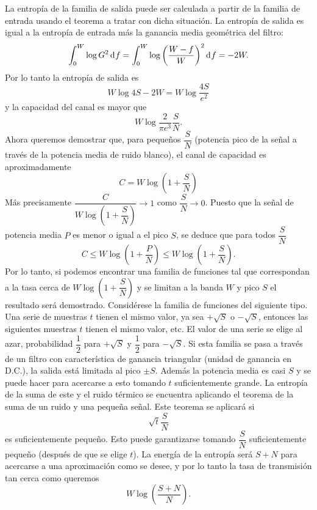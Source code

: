 La entrop\'ia de la familia de salida puede ser calculada a partir
de la familia de entrada usando el teorema a tratar con dicha
situaci\'on. La entrop\'ia de salida es igual a la entrop\'ia de
entrada m\'as la ganancia media geom\'etrica del filtro:
\begin{equation}
  \int_{0}^{W} \log G^2 \diff f = \int_{0}^{W} \log \left(
  \dfrac{W - f}{W} \right)^2 \diff f = -2W.
\end{equation}
Por lo tanto la entrop\'ia de salida es
\begin{equation}
  W \log 4S - 2W = W \log \dfrac{4S}{e^2}
\end{equation}
y la capacidad del canal es mayor que
\begin{equation}
  W \log \dfrac{2}{\pi e^3} \dfrac{S}{N}.
\end{equation}
Ahora queremos demostrar que, para peque\~nos $\dfrac{S}{N}$
(potencia pico de la se\~nal a trav\'es de la potencia media de
ruido blanco), el canal de capacidad es aproximadamente
\begin{equation}
  C = W \log \left(1 + \dfrac{S}{N} \right)
\end{equation}
M\'as precisamente
$\dfrac{C}{W \log \left(1 + \dfrac{S}{N} \right)} \to 1$ como
$\dfrac{S}{N} \to 0$. Puesto que la se\~nal de potencia media $P$ es
menor o igual a el pico $S$, se deduce que para todos $\dfrac{S}{N}$
\begin{equation}
  C \le W \log \left(1 + \dfrac{P}{N} \right)
  \le W \log \left(1 + \dfrac{S}{N} \right).
\end{equation}
Por lo tanto, si podemos encontrar una familia de funciones tal que
correspondan a la tasa cerca de
$W \log \left(1 + \dfrac{S}{N} \right)$ y se limitan a la banda $W$
y pico $S$ el resultado ser\'a demostrado. Consid\'erese la familia
de funciones del siguiente tipo. Una serie de muestras $t$ tienen el
mismo valor, ya sea $+\sqrt{S}$ o $-\sqrt{S}$, entonces las
siguientes muestras $t$ tienen el mismo valor, etc. El valor de una
serie se elige al azar, probabilidad $\dfrac{1}{2}$ para $+\sqrt{S}$
y $\dfrac{1}{2}$ para $-\sqrt{S}$. Si esta familia se pasa a trav\'es
de un filtro con caracter\'istica de ganancia triangular (unidad de
ganancia en D.C.), la salida est\'a limitada al pico $\pm S$.
Adem\'as la potencia media es casi $S$ y se puede hacer para
acercarse a esto tomando $t$ suficientemente grande. La entrop\'ia
de la suma de este y el ruido t\'ermico se encuentra aplicando el
teorema de la suma de un ruido y una peque\~na se\~nal. Este teorema
se aplicar\'a si
\begin{equation}
  \sqrt{t} \dfrac{S}{N}
\end{equation}
es suficientemente peque\~no. Esto puede garantizarse tomando
$\dfrac{S}{N}$ suficientemente peque\~no (despu\'es de que se elige
$t$). La energ\'ia de la entrop\'ia ser\'a $S + N$ para acercarse a
una aproximaci\'on como se desee, y por lo tanto la tasa de
transmisi\'on tan cerca como queremos
\begin{equation}
  W \log \left(\dfrac{S + N}{N} \right).
\end{equation}


